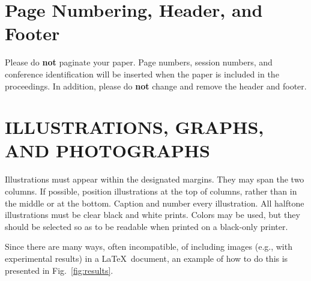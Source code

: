 \documentclass{article}
\begin{document}
\begin{sloppy}
\section{Page Numbering, Header, and Footer}
\label{sec:page}

Please do {\bf not} paginate your paper. Page numbers, 
session numbers, and conference identification will be 
inserted when the paper is included in the proceedings.
In addition, please do {\bf not} change and remove
the header and footer.

\section{ILLUSTRATIONS, GRAPHS, AND PHOTOGRAPHS}
\label{sec:illust}

Illustrations must appear within the designated margins.  
They may span the two columns. If possible, position 
illustrations at the top of columns, rather than in 
the middle or at the bottom. Caption and number every 
illustration. All halftone illustrations must be clear 
black and white prints. Colors may be used, but they 
should be selected so as to be readable when printed 
on a black-only printer.

Since there are many ways, often incompatible, of 
including images (e.g., with experimental results) 
in a \LaTeX\ document, an example of how to do
this is presented in Fig.~\ref{fig:results}.


\end{sloppy}
\end{document}
